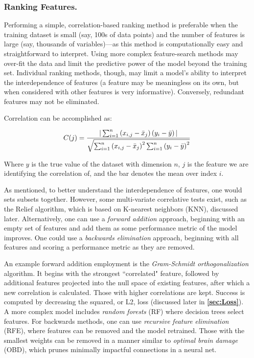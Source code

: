 \subsubsection{Ranking Features.}

Performing a simple, correlation-based ranking method is preferable when the training dataset is small (say, 100s of data points) and the number of features is large (say, thousands of variables)---as this method is computationally easy and straightforward to interpret. Using more complex feature-search methods may over-fit the data and limit the predictive power of the model beyond the training set. Individual ranking methods, though, may limit a model's ability to interpret the interdependence of features (a feature may be meaningless on its own, but when considered with other features is very informative). Conversely, redundant features may not be eliminated. \newline

Correlation can be accomplished as: 

\begin{equation}
\begin{split}
    C(j) = \frac{|\sum_{i = 1}^n \left(x_{i,j} - \bar{x}_{j}\right) \left(y_i - \bar{y}\right) |}{\sqrt{\sum_{i = 1}^n \left(x_{i,j} - \bar{x}_{j}\right)^2 \sum_{i = 1}^n\left(y_i - \bar{y}\right)^2}}
\end{split}
\end{equation}

Where $y$ is the true value of the dataset with dimension $n$, $j$ is the feature we are identifying the correlation of, and the bar denotes the mean over index $i$.\newline

As mentioned, to better understand the interdependence of features, one would sets subsets together. However, some multi-variate correlative tests exist, such as the Relief algorithm, which is based on K-nearest neighbors (KNN), discussed later. Alternatively, one can use a \textit{forward addition} approach, beginning with an empty set of features and add them as some performance metric of the model improves. One could use a \textit{backwards elimination} approach, beginning with all features and scoring a performance metric as they are removed. \newline

An example forward addition employment is the \textit{Gram-Schmidt orthogonalization} algorithm. It begins with the strongest ``correlated" feature, followed by additional features projected into the null space of existing features, after which a new correlation is calculated. Those with higher correlations are kept. Success is computed by decreasing the squared, or L2, loss (discussed later in \textbf{\ref{sec:Loss}}). A more complex model includes \textit{random forests} (RF) where decision trees select features. For backwards methods, one can use \textit{recursive feature elimination} (RFE), where features can be removed and the model retrained. Those with the smallest weights can be removed in a manner similar to \textit{optimal brain damage} (OBD), which prunes minimally impactful connections in a neural net. 




